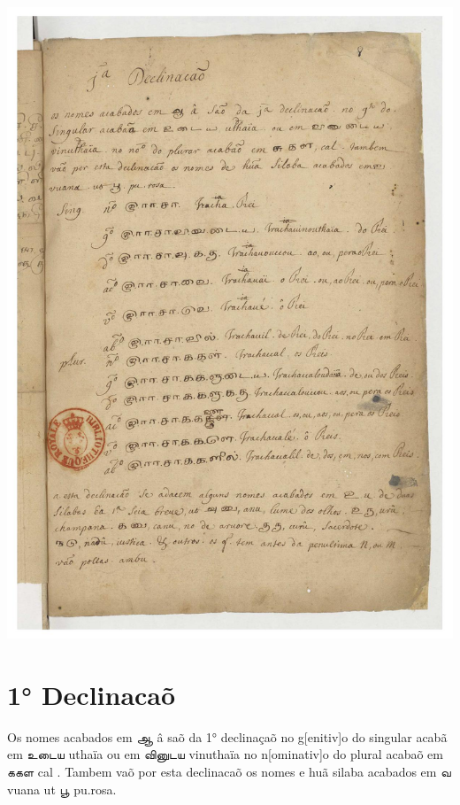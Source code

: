 \documentclass[12pt,a4paper]{scrbook}
\begin{document}
\newpage
\hypertarget{img-25}{
    \includegraphics[width=\textwidth]{img-25}}
\newpage
        \chapter*{1° Declinacaõ}
    
        


            Os nomes acabados em ஆ â saõ da 1° declinaçaõ no g[enitiv]o do 
            singular acabã em உடைய uthaïa ou em வினுடய
            vinuthaïa no n[ominativ]o do plural acabaõ em ககள cal . Tambem
            vaõ por esta declinacaõ os nomes e huã silaba acabados em வ
            vuana ut பூ pu.rosa. 
        
\end{document}
